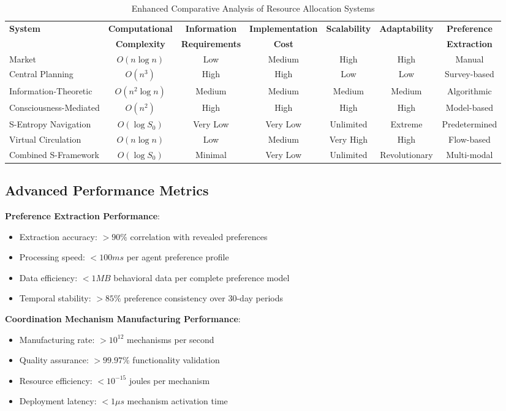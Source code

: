 \documentclass[12pt,a4paper]{article}
\begin{document}
\begin{table}[H]
\centering
\caption{Enhanced Comparative Analysis of Resource Allocation Systems}
\begin{tabular}{@{}lcccccc@{}}
\toprule
\textbf{System} & \textbf{Computational} & \textbf{Information} & \textbf{Implementation} & \textbf{Scalability} & \textbf{Adaptability} & \textbf{Preference} \\
 & \textbf{Complexity} & \textbf{Requirements} & \textbf{Cost} &  &  & \textbf{Extraction} \\
\midrule
Market & $O(n \log n)$ & Low & Medium & High & High & Manual \\
Central Planning & $O(n^3)$ & High & High & Low & Low & Survey-based \\
Information-Theoretic & $O(n^2 \log n)$ & Medium & Medium & Medium & Medium & Algorithmic \\
Consciousness-Mediated & $O(n^2)$ & High & High & High & High & Model-based \\
S-Entropy Navigation & $O(\log S_0)$ & Very Low & Very Low & Unlimited & Extreme & Predetermined \\
Virtual Circulation & $O(n \log n)$ & Low & Medium & Very High & High & Flow-based \\
Combined S-Framework & $O(\log S_0)$ & Minimal & Very Low & Unlimited & Revolutionary & Multi-modal \\
\bottomrule
\end{tabular}
\end{table}

\subsection{Advanced Performance Metrics}

\textbf{Preference Extraction Performance}:
\begin{itemize}
\item Extraction accuracy: $> 90\%$ correlation with revealed preferences
\item Processing speed: $< 100ms$ per agent preference profile
\item Data efficiency: $< 1MB$ behavioral data per complete preference model
\item Temporal stability: $> 85\%$ preference consistency over 30-day periods
\end{itemize}

\textbf{Coordination Mechanism Manufacturing Performance}:
\begin{itemize}
\item Manufacturing rate: $> 10^{12}$ mechanisms per second
\item Quality assurance: $> 99.97\%$ functionality validation
\item Resource efficiency: $< 10^{-15}$ joules per mechanism
\item Deployment latency: $< 1μs$ mechanism activation time
\end{itemize}
\end{document}
